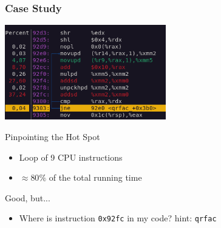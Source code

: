 \documentclass[xcolor={x11names,svgnames}]{beamer}
\begin{document}

\begin{frame}
  \frametitle{Case Study}

  \noindent\includegraphics[width=7cm]{perf2.png}

  \begin{alertblock}{Pinpointing the Hot Spot}
    \begin{itemize}
    \item Loop of 9 CPU instructions
    \item $\approx 80\%$ of the total running time 
    \end{itemize}
  \end{alertblock}
  
  \begin{block}{Good, but...}
    \begin{itemize}
    \item Where is instruction \texttt{0x92fc} in my code? {\tiny hint: \texttt{qrfac}}
    \end{itemize}
  \end{block}
\end{frame}

\end{document}
